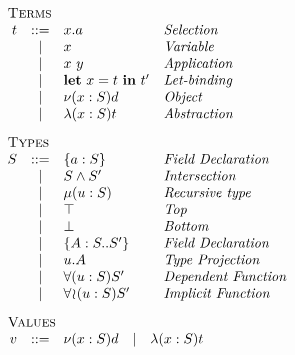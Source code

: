 \begin{minipage}[t]{.5\textwidth}\[\begin{array}{r c l l}
    \multicolumn{4}{l}{\textsc{Terms}}                      \\
    t & ::= & x.a             & \textit{Selection         } \\
      &  |  & x               & \textit{Variable          } \\
      &  |  & x\ y            & \textit{Application       } \\
      &  |  & \LET{x}{t}{t'}  & \textit{Let-binding       } \\
      &  |  & \OBJ{x}{S}{d}   & \textit{Object            } \\
      &  |  & \ABS{x}{S}{t}   & \textit{Abstraction       } \\[3mm]
    \multicolumn{4}{l}{\textsc{Types}}                      \\
    S & ::= & \FDEC{a}{S}     & \textit{Field Declaration } \\
      &  |  & \AGG{S}{S'}     & \textit{Intersection      } \\
      &  |  & \REC{u}{S}      & \textit{Recursive type    } \\
      &  |  & \top            & \textit{Top               } \\
      &  |  & \bot            & \textit{Bottom            } \\
      &  |  & \TDEC{A}{S}{S'} & \textit{Field Declaration } \\
      &  |  & u.A             & \textit{Type Projection   } \\
      &  |  & \DFUN{u}{S}{S'} & \textit{Dependent Function} \\
      &  |  & \IFUN{u}{S}{S'} & \textit{Implicit Function } \\[3mm]
    \multicolumn{4}{l}{\textsc{Values}} \\
    v & ::= & \multicolumn{2}{l}{\OBJ{x}{S}{d}
        \quad | \quad \ABS{x}{S}{t}} \\[3mm]
\end{array}\]\end{minipage}
